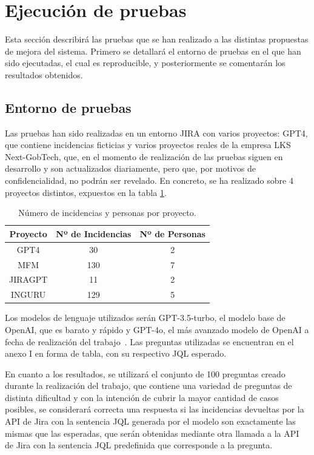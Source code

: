 \section{Ejecución de pruebas}
Esta sección describirá las pruebas que se han realizado a las distintas propuestas de mejora del sistema. Primero se detallará el entorno de pruebas en el que han sido ejecutadas, el cual es reproducible, y posteriormente se comentarán los resultados obtenidos.

\subsection{Entorno de pruebas}
Las pruebas han sido realizadas en un entorno JIRA con varios proyectos: GPT4, que contiene incidencias ficticias y varios proyectos reales de la empresa LKS Next-GobTech, que, en el momento de realización de las pruebas siguen en desarrollo y son actualizados diariamente, pero que, por motivos de confidencialidad, no podrán ser revelado. En concreto, se ha realizado sobre 4 proyectos distintos, expuestos en la tabla \ref{tab:proyectos}.

\begin{table}[h]
\centering
\begin{tabular}{|c|c|c|}
\hline
\textbf{Proyecto} & \textbf{Nº de Incidencias} & \textbf{Nº de Personas} \\
\hline
GPT4 & 30 & 2 \\
\hline
MFM & 130 & 7 \\
\hline
JIRAGPT & 11 & 2 \\
\hline
INGURU & 129 & 5 \\
\hline
\end{tabular}
\caption{Número de incidencias y personas por proyecto.}
\label{tab:proyectos}
\end{table}

Los modelos de lenguaje utilizados serán GPT-3.5-turbo, el modelo base de OpenAI, que es barato y rápido y GPT-4o, el más avanzado modelo de OpenAI a fecha de realización del trabajo~\cite{gpt4o}. Las preguntas utilizadas se encuentran en el anexo I en forma de tabla, con su respectivo JQL esperado.

En cuanto a los resultados, se utilizará el conjunto de 100 preguntas creado durante la realización del trabajo, que contiene una variedad de preguntas de distinta dificultad y con la intención de cubrir la mayor cantidad de casos posibles, se considerará correcta una respuesta si las incidencias devueltas por la API de Jira con la sentencia JQL generada por el modelo son exactamente las mismas que las esperadas, que serán obtenidas mediante otra llamada a la API de Jira con la sentencia JQL predefinida que corresponde a la pregunta.


